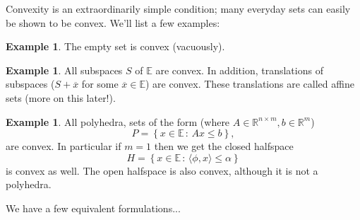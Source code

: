 \documentclass{article}
\numberwithin{equation}{section}
\theoremstyle{definition}
\newtheorem{example}[theorem]{Example}
\newcommand{\bE}{\mathbb{E}}
\newcommand{\bR}{\mathbb{R}}
\newcommand{\set}[2]{\left\{#1\,:\,#2\right\}}
\begin{document}
Convexity is an extraordinarily simple condition; many everyday sets can easily be shown to be convex. We'll list a few examples:
\begin{example}
    The empty set is convex (vacuously).
\end{example}
\begin{example}
    All subspaces $S$ of $\bE$ are convex. In addition, translations of subspaces ($S+\overline x$ for some $\overline x\in\bE$) are convex. These translations are called affine sets (more on this later!).
\end{example}
\begin{example}
    All polyhedra, sets of the form (where $A\in\bR^{n\times m}, b\in\bR^m$)
    \begin{equation}
        P=\set{x\in\bE}{Ax\le b},
    \end{equation}
    are convex. In particular if $m=1$ then we get the closed halfspace
    \begin{equation}
        H=\set{x\in\bE}{\langle\phi, x\rangle \le \alpha}
    \end{equation}
    is convex as well. The open halfspace is also convex, although it is not a polyhedra.
\end{example}
We have a few equivalent formulations...
\end{document}
